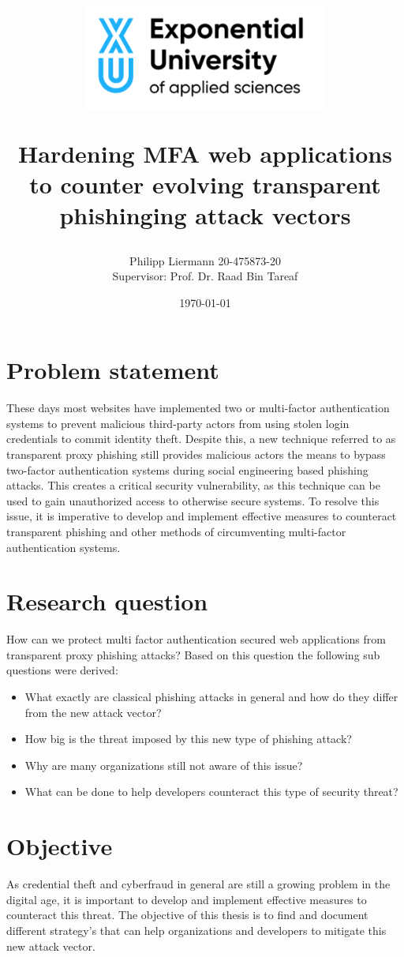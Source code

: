 \documentclass [14pt]{extarticle}
\author{Philipp Liermann 20-475873-20\\Supervisor: Prof. Dr. Raad Bin Tareaf}
\date{\today}
\title{
	\begin{center}
		\includegraphics[width=8cm]{./images/logo.png}
	\end{center}
	\vspace{2cm}
        Hardening MFA web applications to counter evolving transparent phishinging attack vectors
	\vspace{2cm}
	\large 
}
\begin{document}
\maketitle

\newpage
\tableofcontents

\newpage
\section{Problem statement}
These days most websites have implemented two or multi-factor authentication systems to prevent malicious third-party actors from using stolen login credentials to commit identity theft. Despite this, a new technique referred to as transparent proxy phishing still provides malicious actors the means to bypass two-factor authentication systems during social engineering based phishing attacks. This creates a critical security vulnerability, as this technique can be used to gain unauthorized access to otherwise secure systems. To resolve this issue, it is imperative to develop and implement effective measures to counteract transparent phishing and other methods of circumventing multi-factor authentication systems.

\section{Research question}
How can we protect multi factor authentication secured web applications from transparent proxy phishing attacks?
Based on this question the following sub questions were derived:
\begin{itemize}
	\item What exactly are classical phishing attacks in general and how do they differ from the new attack vector?
	\item How big is the threat imposed by this new type of phishing attack?
	\item Why are many organizations still not aware of this issue?
	\item What can be done to help developers counteract this type of security threat?
\end{itemize}

\section{Objective}
As credential theft and cyberfraud in general are still a growing problem in the digital age, it is important to develop and implement effective measures to counteract this threat. The objective of this thesis is to find and document different strategy's that can help organizations and developers to mitigate this new attack vector.
\end{document}
